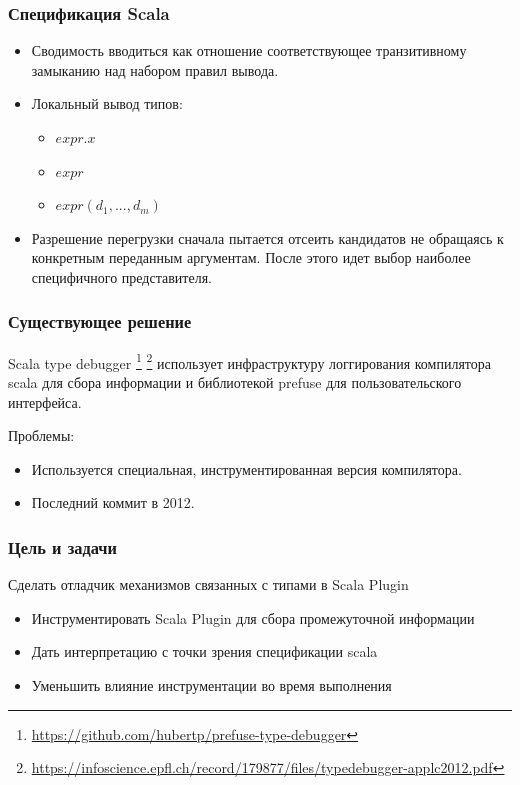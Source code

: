 \documentclass{beamer}
\begin{document}
\begin{frame}
\frametitle{Спецификация Scala}
\begin{itemize}
  \item Сводимость вводиться как отношение соответствующее транзитивному замыканию над набором правил вывода.
  \item Локальный вывод типов:
  \begin{itemize}
    \item $expr.x$
    \item $expr$
    \item $expr(d_1,..., d_m)$
  \end{itemize}
  \item Разрешение перегрузки сначала пытается отсеить кандидатов не обращаясь к конкретным переданным аргументам.
  После этого идет выбор наиболее специфичного представителя.
\end{itemize}
\end{frame}

\begin{frame}
\frametitle{Существующее решение}
Scala type debugger
\footnote{\scriptsize{\url{https://github.com/hubertp/prefuse-type-debugger}}}
\footnote{\scriptsize{\url{https://infoscience.epfl.ch/record/179877/files/typedebugger-applc2012.pdf}}}
использует инфраструктуру логгирования компилятора scala для сбора информации
и библиотекой prefuse для пользовательского интерфейса.

\vfill

Проблемы:
\begin{itemize}
  \item Используется специальная, инструментированная версия компилятора.
  \item Последний коммит в 2012.
\end{itemize}
\end{frame}


\begin{frame}
\frametitle{Цель и задачи}
Сделать отладчик механизмов связанных с типами в Scala Plugin
\begin{itemize}
  \item Инструментировать Scala Plugin для сбора промежуточной информации
  \item Дать интерпретацию с точки зрения спецификации scala
  \item Уменьшить влияние инструментации во время выполнения
\end{itemize}
\end{frame}
\end{document}
